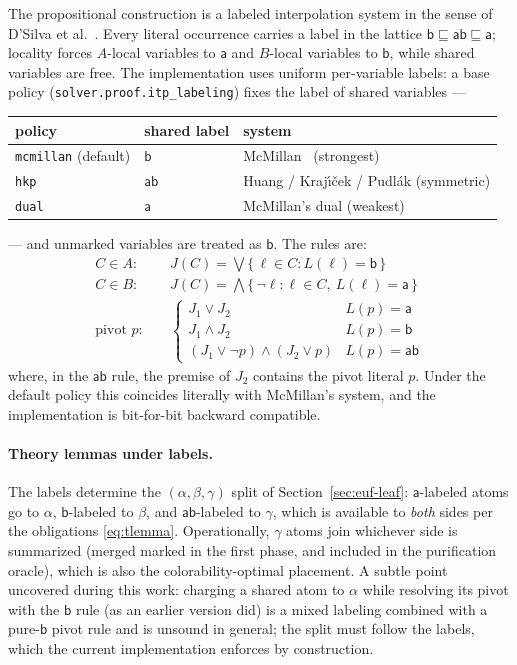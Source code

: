 \documentclass[11pt]{article}
\newcommand{\lbla}{\mathsf{a}}
\newcommand{\lblb}{\mathsf{b}}
\newcommand{\lblab}{\mathsf{ab}}
\newcommand{\opt}[1]{\texttt{#1}}
\begin{document}
The propositional construction is a labeled interpolation system in the
sense of D'Silva et al.~\cite{lis}. Every literal occurrence carries a label
in the lattice $\lblb \sqsubseteq \lblab \sqsubseteq \lbla$; locality forces
$A$-local variables to $\lbla$ and $B$-local variables to $\lblb$, while
shared variables are free. The implementation uses uniform per-variable
labels: a base policy (\opt{solver.proof.itp\_labeling}) fixes the label of
shared variables ---
\begin{center}
\begin{tabular}{lll}
\toprule
policy & shared label & system \\
\midrule
\opt{mcmillan} (default) & $\lblb$ & McMillan~\cite{mcmillan} (strongest) \\
\opt{hkp}                & $\lblab$ & Huang / Kraj\'{\i}\v{c}ek / Pudl\'ak (symmetric) \\
\opt{dual}               & $\lbla$ & McMillan's dual (weakest) \\
\bottomrule
\end{tabular}
\end{center}
--- and unmarked variables are treated as $\lblb$. The rules are:
\begin{align*}
C \in A:&\quad J(C) = \bigvee \{\, \ell \in C : L(\ell) = \lblb \,\} \\
C \in B:&\quad J(C) = \bigwedge \{\, \neg\ell : \ell \in C,\ L(\ell) = \lbla \,\} \\
\text{pivot } p:&\quad
\begin{cases}
J_1 \vee J_2 & L(p) = \lbla \\
J_1 \wedge J_2 & L(p) = \lblb \\
(J_1 \vee \neg p) \wedge (J_2 \vee p) & L(p) = \lblab
\end{cases}
\end{align*}
where, in the $\lblab$ rule, the premise of $J_2$ contains the pivot literal
$p$. Under the default policy this coincides literally with McMillan's
system, and the implementation is bit-for-bit backward compatible.

\paragraph{Theory lemmas under labels.}
The labels determine the $(\alpha, \beta, \gamma)$ split of
Section~\ref{sec:euf-leaf}: $\lbla$-labeled atoms go to $\alpha$,
$\lblb$-labeled to $\beta$, and $\lblab$-labeled to $\gamma$, which is
available to \emph{both} sides per the obligations \eqref{eq:tlemma}.
Operationally, $\gamma$ atoms join whichever side is summarized (merged
marked in the first phase, and included in the purification oracle), which
is also the colorability-optimal placement. A subtle point uncovered during
this work: charging a shared atom to $\alpha$ while resolving its pivot with
the $\lblb$ rule (as an earlier version did) is a mixed labeling combined
with a pure-$\lblb$ pivot rule and is unsound in general; the split must
follow the labels, which the current implementation enforces by
construction.
\end{document}
